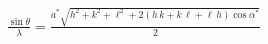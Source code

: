 


\begin{eqnarray*}
  \frac{\sin \theta}{\lambda} = \frac{a^\ast \sqrt{h^2+k^2+\ell^2 + 2\left( h\,k + k\,\ell + \ell\,h \right) \cos \alpha^\ast}}{2}
\end{eqnarray*}

